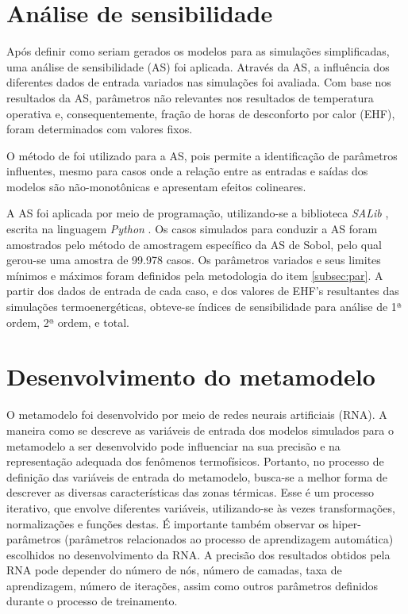 \documentclass[brazil,hardcopy,openany,a5paper]{ufscthesis}
\begin{document}
		\section{Análise de sensibilidade}
		
		Após definir como seriam gerados os modelos para as simulações simplificadas, uma análise de sensibilidade (AS) foi aplicada. Através da AS, a influência dos diferentes dados de entrada variados nas simulações foi avaliada. Com base nos resultados da AS, parâmetros não relevantes nos resultados de temperatura operativa e, consequentemente, fração de horas de desconforto por calor (EHF), foram determinados com valores fixos.
		
		O método de  \cite{Sobol1993} foi utilizado para a AS, pois permite a identificação de parâmetros influentes, mesmo para casos onde a relação entre as entradas e saídas dos modelos são não-monotônicas e apresentam efeitos colineares.
		
		A AS foi aplicada por meio de programação, utilizando-se a biblioteca \textit{SALib} \cite{Herman2017}, escrita na linguagem \textit{Python} \cite{Python}.
		Os casos simulados para conduzir a AS foram amostrados pelo método de amostragem específico da AS de Sobol, pelo qual gerou-se uma amostra de 99.978 casos.
		Os parâmetros variados e seus limites mínimos e máximos foram definidos pela metodologia do item \ref{subsec:par}. 
		A partir dos dados de entrada de cada caso, e dos valores de EHF's resultantes das simulações termoenergéticas, obteve-se índices de sensibilidade para análise de 1ª ordem, 2ª ordem, e total.
		
		\section{Desenvolvimento do metamodelo}
		
		O metamodelo foi desenvolvido por meio de redes neurais artificiais (RNA).		
		A maneira como se descreve as variáveis de entrada dos modelos simulados para o metamodelo a ser desenvolvido pode influenciar na sua precisão e na representação adequada dos fenômenos termofísicos.
		Portanto, no processo de definição das variáveis de entrada do metamodelo, busca-se a melhor forma de descrever as diversas características das zonas térmicas.
		Esse é um processo iterativo, que envolve diferentes variáveis, utilizando-se às vezes transformações, normalizações e funções destas. 
		É importante também observar os hiper-parâmetros (parâmetros relacionados ao processo de aprendizagem automática) escolhidos no desenvolvimento da RNA. 
		A precisão dos resultados obtidos pela RNA pode depender do número de nós, número de camadas, taxa de aprendizagem, número de iterações, assim como outros parâmetros definidos durante o processo de treinamento. 
		
\end{document}
